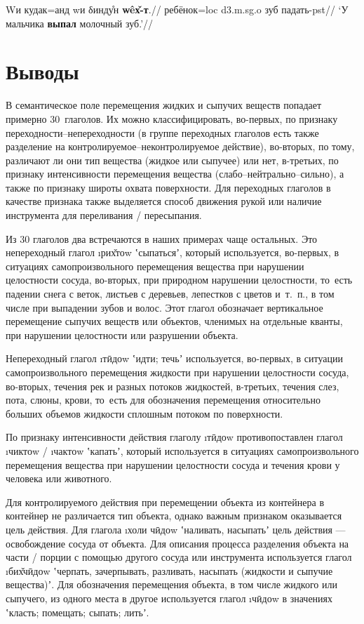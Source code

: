 \begingl
\gla Wи кудак=анд wи δинду̊н \textbf{wêх̌-т}.//
 ребёнок={\sc loc} {\sc d3.m.sg.o} зуб падать-{\sc pst}//
\glft ‘У мальчика \textbf{выпал} молочный зуб.’//
\endgl \xe

\section{Выводы} \label{pour-conclusions}

В семантическое поле перемещения жидких и сыпучих веществ  попадает примерно 30~глаголов. Их можно классифицировать, во-первых, по признаку переходности–непереходности (в группе переходных глаголов есть также разделение на контролируемое–неконтролируемое действие), во-вторых, по тому, различают ли они тип вещества (жидкое или сыпучее) или нет, в-третьих, по признаку интенсивности перемещения вещества (слабо–нейтрально–сильно), а также по признаку широты охвата поверхности. Для переходных глаголов в качестве признака также выделяется способ движения рукой или наличие инструмента для переливания / пересыпания.

Из 30 глаголов два встречаются в наших примерах чаще остальных. Это непереходный глагол \i{рих̌тоw} ʽсыпатьсяʼ, который используется, во-первых, в ситуациях самопроизвольного перемещения вещества при нарушении целостности сосуда, во-вторых, при природном нарушении целостности, то~есть падении снега с веток, листьев с деревьев, лепестков с цветов и~т.~п., в том числе при выпадении зубов и волос. Этот глагол обозначает вертикальное перемещение сыпучих веществ или объектов, членимых на отдельные кванты, при нарушении целостности или разрушении объекта.

Непереходный глагол \i{тӣдоw} ʽидти; течьʼ используется, во-первых, в ситуации самопроизвольного перемещения жидкости при нарушении целостности сосуда, во-вторых, течения рек и разных потоков жидкостей, в-третьих, течения слез, пота, слюны, крови, то~есть для обозначения перемещения относительно больших объемов жидкости сплошным потоком по поверхности.

По признаку интенсивности действия глаголу \i{тӣдоw} противопоставлен глагол \i{чиктоw} / \i{чактоw} ʽкапатьʼ, который используется в ситуациях самопроизвольного перемещения вещества при нарушении целостности сосуда и течения крови у человека или животного.

Для контролируемого действия при перемещении объекта из контейнера в контейнер не различается тип объекта, однако важным признаком оказывается цель действия. Для глагола \i{холи чӣдоw} ʽналивать, насыпатьʼ цель действия — освобождение сосуда от объекта. Для описания процесса разделения объекта на части / порции с помощью другого сосуда или инструмента используется глагол \i{бих̌чӣдоw} ʽчерпать, зачерпывать, разливать, насыпать (жидкости и сыпучие вещества)ʼ. Для обозначения перемещения объекта, в том числе жидкого или сыпучего, из одного места в другое используется глагол \i{чӣдоw} в значениях ʽкласть; помещать; сыпать; литьʼ.

